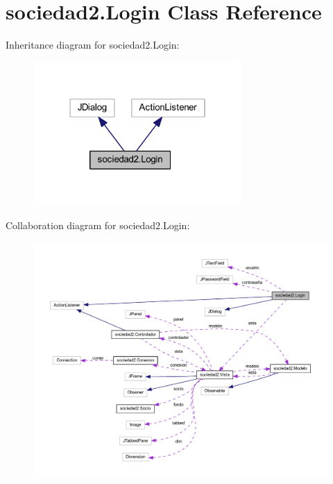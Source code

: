 \hypertarget{classsociedad2_1_1_login}{}\section{sociedad2.\+Login Class Reference}
\label{classsociedad2_1_1_login}


Inheritance diagram for sociedad2.\+Login\+:\nopagebreak
\begin{figure}[H]
\begin{center}
\leavevmode
\includegraphics[width=226pt]{classsociedad2_1_1_login__inherit__graph}
\end{center}
\end{figure}


Collaboration diagram for sociedad2.\+Login\+:
\nopagebreak
\begin{figure}[H]
\begin{center}
\leavevmode
\includegraphics[width=350pt]{classsociedad2_1_1_login__coll__graph}
\end{center}
\end{figure}
